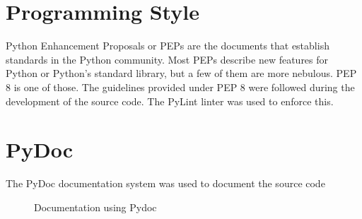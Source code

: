   \section{Programming Style}
  Python Enhancement Proposals or PEPs are the documents that establish standards in the Python community. Most PEPs describe new features for Python or Python's standard library, but a few of them are more nebulous. PEP 8 is one of those\cite{python}. The guidelines provided under PEP 8 were followed during the development of the source code. The PyLint linter was used to enforce this. 

  \section{PyDoc}
    The PyDoc documentation system was used to document the source code
    \begin{figure}[h!]
      \centering
      \caption{Documentation using Pydoc}
      \label{fig:pydoc}
    \end{figure}


